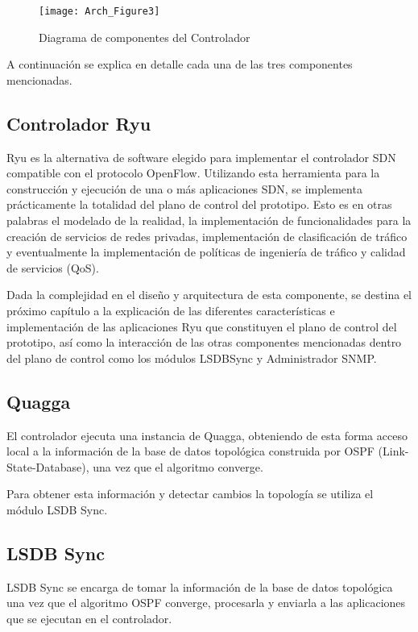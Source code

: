 \begin{figure}[h] 
\centering    
\texttt{[image: Arch\_Figure3]}
\caption[Diagrama de componentes del Controlador]{Diagrama de componentes del Controlador}
\label{fig:OpenSourceRArch3}
\end{figure}

A continuación se explica en detalle cada una de las tres componentes mencionadas.

\subsection{Controlador Ryu}
Ryu es la alternativa de software elegido para implementar el controlador SDN compatible con el protocolo OpenFlow. Utilizando esta herramienta para la construcci\'on y ejecuci\'on de una o m\'as aplicaciones SDN, se implementa prácticamente la totalidad del plano de control del prototipo. Esto es en otras palabras el modelado de la realidad, la implementaci\'on de funcionalidades para la creaci\'on de servicios de redes privadas, implementaci\'on de clasificaci\'on de tr\'afico y eventualmente la implementaci\'on de pol\'iticas de ingeniería de tr\'afico y calidad de servicios (QoS).

Dada la complejidad en el diseño y arquitectura de esta componente, se destina el próximo cap\'itulo a la explicaci\'on de las diferentes características e implementaci\'on de las aplicaciones Ryu que constituyen el plano de control del prototipo, as\'i como la interacci\'on de las otras componentes mencionadas dentro del plano de control como los m\'odulos LSDBSync y Administrador SNMP. 

\subsection{Quagga}
El controlador ejecuta una instancia de Quagga, obteniendo de esta forma acceso local a la información de la base de datos topol\'ogica construida por OSPF (Link-State-Database), una vez que el algoritmo converge.

Para obtener esta informaci\'on y detectar cambios la topolog\'ia se utiliza el m\'odulo LSDB Sync.

\subsection{LSDB Sync}
LSDB Sync se encarga de tomar la información de la base de datos topol\'ogica una vez que el algoritmo OSPF converge, procesarla y enviarla a las aplicaciones que se ejecutan en el controlador.

